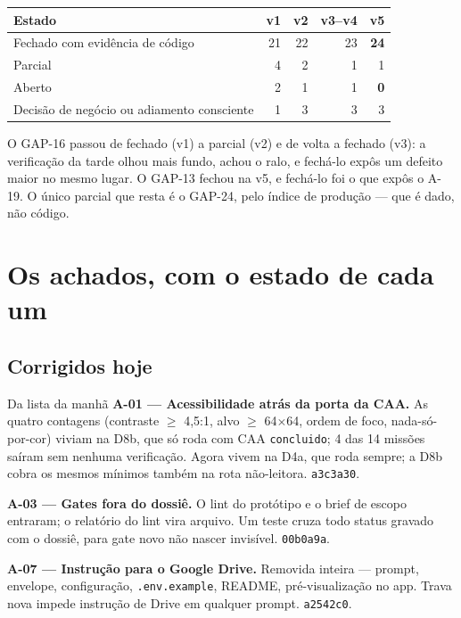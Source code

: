\documentclass[11pt,a4paper]{article}
\begin{document}
\begin{center}
\small
\begin{tabular}{@{}lrrrr@{}}
\toprule
\textbf{Estado} & \textbf{v1} & \textbf{v2} & \textbf{v3--v4} & \textbf{v5} \\
\midrule
Fechado com evidência de código & 21 & 22 & 23 & \textbf{24} \\
Parcial & 4 & 2 & 1 & 1 \\
Aberto & 2 & 1 & 1 & \textbf{0} \\
Decisão de negócio ou adiamento consciente & 1 & 3 & 3 & 3 \\
\bottomrule
\end{tabular}
\end{center}

O GAP-16 passou de fechado (v1) a parcial (v2) e de volta a fechado (v3): a verificação da tarde olhou mais fundo, achou o ralo, e fechá-lo expôs um defeito maior no mesmo lugar. O GAP-13 fechou na v5, e fechá-lo foi o que expôs o A-19. O único parcial que resta é o GAP-24, pelo índice de produção --- que é dado, não código.

\section{Os achados, com o estado de cada um}

\subsection{Corrigidos hoje}

\begin{sucessobox}{Da lista da manhã}
\textbf{A-01 --- Acessibilidade atrás da porta da CAA.} As quatro contagens (contraste $\geq$ 4,5:1, alvo $\geq$ 64$\times$64, ordem de foco, nada-só-por-cor) viviam na D8b, que só roda com CAA \texttt{concluido}; 4 das 14 missões saíram sem nenhuma verificação. Agora vivem na D4a, que roda sempre; a D8b cobra os mesmos mínimos também na rota não-leitora. \texttt{a3c3a30}.

\medskip
\textbf{A-03 --- Gates fora do dossiê.} O lint do protótipo e o brief de escopo entraram; o relatório do lint vira arquivo. Um teste cruza todo status gravado com o dossiê, para gate novo não nascer invisível. \texttt{00b0a9a}.

\medskip
\textbf{A-07 --- Instrução para o Google Drive.} Removida inteira --- prompt, envelope, configuração, \texttt{.env.example}, README, pré-visualização no app. Trava nova impede instrução de Drive em qualquer prompt. \texttt{a2542c0}.
\end{sucessobox}
\end{document}
